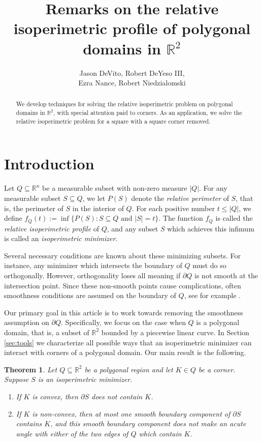 \documentclass[leqno]{article}
\title{Remarks on the relative isoperimetric profile of polygonal domains in $\mathbb{R}^2$}
\author{Jason DeVito, Robert DeYeso III,\\ Ezra Nance, Robert Niedzialomski}
\date{}
\numberwithin{equation}{section}
\newtheorem{theorem}[equation]{Theorem}
\theoremstyle{definition}
\theoremstyle{remark}
\theoremstyle{plain}
\begin{document}
\maketitle

\begin{abstract}
We develop techniques for solving the relative isoperimetric problem on polygonal domains in $\mathbb{R}^2$, with special attention paid to corners.  As an application, we solve the relative isoperimetric problem for a square with a square corner removed.
\end{abstract}


\section{Introduction}



Let $Q\subseteq \mathbb{R}^n$ be a measurable subset with non-zero measure $|Q|$. For any measurable subset $S\subseteq Q$, we let $P(S)$ denote the \textit{relative perimeter} of $S$, that is, the perimeter of $S$ in the interior of $Q$.  For each positive number $t\leq |Q|$, we define $f_{Q}(t) := \inf \{P(S): S\subseteq Q \text{ and } |S| = t\}$.  The function $f_Q$ is called the \textit{relative isoperimetric profile} of $Q$, and any subset $S$ which achieves this infimum is called an \textit{isoperimetric minimizer}.

Several necessary conditions are known about these minimizing subsets. For instance, any minimizer which intersects the boundary of $Q$ must do so orthogonally. However, orthogonality loses all meaning if $\partial Q$ is not smooth at the intersection point. Since these non-smooth points cause complications, often smoothness conditions are assumed on the boundary of $Q$, see for example \cite{CGR,MBNPR,SZ}. %

Our primary goal in this article is to work towards removing the smoothness assumption on $\partial Q$. Specifically, we focus on the case when $Q$ is a polygonal domain, that is, a subset of $\mathbb{R}^2$ bounded by a piecewise linear curve. In Section~ \ref{sec:tools} we characterize all possible ways that an isoperimetric minimizer can interact with corners of a polygonal domain. Our main result is the following.

\begin{theorem}\label{thm:main2}
Let $Q\subseteq \mathbb{R}^2$ be a polygonal region and let $K\in Q$ be a corner. Suppose $S$ is an isoperimetric minimizer. \begin{enumerate}\item If $K$ is convex, then $\partial S$ does not contain $K$.

\item  If $K$ is non-convex, then at most one smooth boundary component of $\partial S$ contains $K$, and this smooth boundary component does not make an acute angle with either of the two edges of $Q$ which contain $K$.
\end{enumerate}
\end{theorem}
\end{document}

